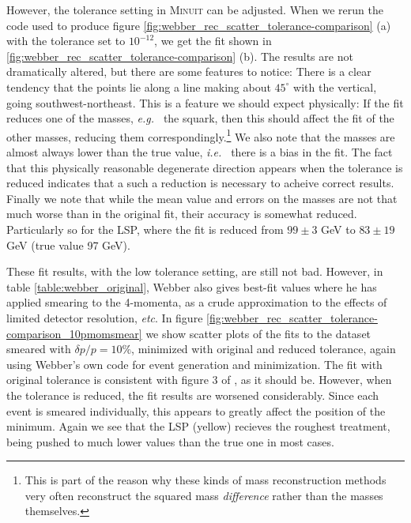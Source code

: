 \documentclass[twoside,english]{uiofysmaster}
\begin{document}
However, the tolerance setting in {\scshape Minuit} can be adjusted. When we rerun the code used to produce figure \ref{fig:webber_rec_scatter_tolerance-comparison} (a) with the tolerance set to $10^{-12}$, we get the fit shown in \ref{fig:webber_rec_scatter_tolerance-comparison} (b). The results are not dramatically altered, but there are some features to notice: There is a clear tendency that the points lie along a line making about $45^\circ$ with the vertical, going southwest-northeast. This is a feature we should expect physically: If the fit reduces one of the masses, {\it e.g.\ } the squark, then this should affect the fit of the other masses, reducing them correspondingly.\footnote{This is part of the reason why these kinds of mass reconstruction methods very often reconstruct the squared mass {\it difference} rather than the masses themselves.} We also note that the masses are almost always lower than the true value, {\it i.e.\ } there is a bias in the fit. The fact that this physically reasonable degenerate direction appears when the tolerance is reduced indicates that a such a reduction is necessary to acheive correct results. Finally we note that while the mean value and errors on the masses are not that much worse than in the original fit, their accuracy is somewhat reduced. Particularly so for the LSP, where the fit is reduced from $99 \pm 3$ GeV to $83 \pm 19$ GeV (true value 97 GeV).

These fit results, with the low tolerance setting, are still not bad. However, in table \ref{table:webber_original}, Webber also gives best-fit values where he has applied smearing to the 4-momenta, as a crude approximation to the effects of limited detector resolution, {\it etc}. In figure \ref{fig:webber_rec_scatter_tolerance-comparison_10pmomsmear} we show scatter plots of the fits to the dataset smeared with $\delta p/p = 10 \%$, minimized with original and reduced tolerance, again using Webber's own code for event generation and minimization. The fit with original tolerance is consistent with figure 3 of \cite{Webber:2009vm}, as it should be. However, when the tolerance is reduced, the fit results are worsened considerably. Since each event is smeared individually, this appears to greatly affect the position of the minimum. Again we see that the LSP (yellow) recieves the roughest treatment, being pushed to much lower values than the true one in most cases.
\end{document}
